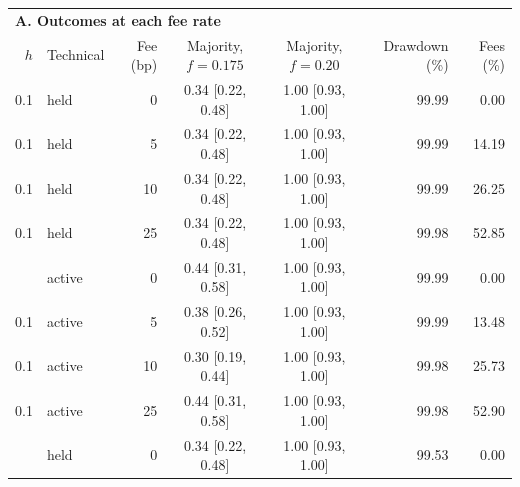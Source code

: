 \clearpage
\begin{center}
\begin{minipage}{\linewidth}\centering
\captionsetup{type=table,hypcap=false}
\caption{Transaction-fee comparisons. Each condition used 50 starting markets.
The fee was charged to each completed buyer and seller from initialization.
Sell-majority probabilities are followed by Wilson 95\% intervals.
In Panel A, drawdown and cumulative dealer fees are medians for the switched runs
at fraction $f=0.20$. Drawdown uses the 3,000-step post-switch observation period, including
the quoted price immediately before the switch. Fees include all 4,000 trading
steps and are expressed as a percentage of initial aggregate trader cash.
Fee income was held separately from trading reserves. Panel B reports
paired differences between 25 and zero basis points with percentile 95\%
intervals from 2,000 whole-market bootstrap samples. The probability difference
is a difference in proportions; drawdown differences are median paired
changes in percentage points. The complete
protocol, all six tested fractions, and paired differences are archived
with the transaction-fee study.}
\label{tab:transaction-fees}
\small\setlength{\tabcolsep}{3pt}
\begin{tabular}{r l r c c r r}
\toprule
\multicolumn{7}{l}{\textbf{A. Outcomes at each fee rate}}\\
$h$ & Technical & Fee (bp) & Majority, $f=0.175$ & Majority, $f=0.20$ & Drawdown (\%) & Fees (\%) \\
\midrule
0.1 & held & 0 & 0.34 [0.22, 0.48] & 1.00 [0.93, 1.00] & 99.99 & 0.00 \\
0.1 & held & 5 & 0.34 [0.22, 0.48] & 1.00 [0.93, 1.00] & 99.99 & 14.19 \\
0.1 & held & 10 & 0.34 [0.22, 0.48] & 1.00 [0.93, 1.00] & 99.99 & 26.25 \\
0.1 & held & 25 & 0.34 [0.22, 0.48] & 1.00 [0.93, 1.00] & 99.98 & 52.85 \\
\addlinespace
0.1 & active & 0 & 0.44 [0.31, 0.58] & 1.00 [0.93, 1.00] & 99.99 & 0.00 \\
0.1 & active & 5 & 0.38 [0.26, 0.52] & 1.00 [0.93, 1.00] & 99.99 & 13.48 \\
0.1 & active & 10 & 0.30 [0.19, 0.44] & 1.00 [0.93, 1.00] & 99.98 & 25.73 \\
0.1 & active & 25 & 0.44 [0.31, 0.58] & 1.00 [0.93, 1.00] & 99.98 & 52.90 \\
\addlinespace
1 & held & 0 & 0.34 [0.22, 0.48] & 1.00 [0.93, 1.00] & 99.53 & 0.00 \\

\end{tabular}
\end{minipage}
\end{center}
